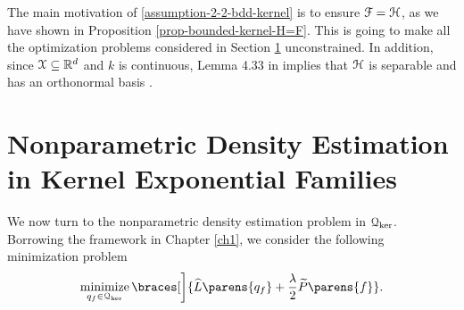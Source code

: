 The main motivation of \ref{assumption-2-2-bdd-kernel} is to ensure $\mathcal{F} = \mathcal{H}$, as we have shown in Proposition \ref{prop-bounded-kernel-H=F}. This is going to make all the optimization problems considered in Section \ref{section-density-estimation} unconstrained. In addition, since $\mathcal{X} \subseteq \mathbb{R}^d$ and $k$ is continuous, Lemma 4.33 in \textcite{Steinwart2008-tn} implies that $\mathcal{H}$ is separable and has an orthonormal basis \parencite[Theorem 11 in][]{Royden2018-cd}. 




\section{Nonparametric Density Estimation in Kernel Exponential Families}\label{section-density-estimation}


We now turn to the nonparametric density estimation problem in $\mathcal{Q}_{\ker}$. Borrowing the framework in Chapter \ref{ch1}, we consider the following minimization problem 
\begin{align}\label{eq-density-estimation-general-kef}
	\minimize_{q_f \in \calQ_{\ker}} \braces[\bigg]{\widehat{L} \parens{q_f} + \frac{\lambda}{2} \widetilde{P} \parens{f}}. 
\end{align}

